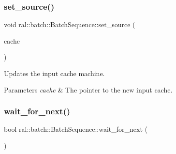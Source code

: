\subsubsection{\texorpdfstring{set\+\_\+source()}{set\_source()}}
{\footnotesize\ttfamily void ral\+::batch\+::\+Batch\+Sequence\+::set\+\_\+source (\begin{DoxyParamCaption}\item[{std\+::shared\+\_\+ptr$<$ \hyperlink{classral_1_1cache_1_1CacheMachine}{ral\+::cache\+::\+Cache\+Machine} $>$}]{cache }\end{DoxyParamCaption})}

Updates the input cache machine. 
\begin{DoxyParams}{Parameters}
{\em cache} & The pointer to the new input cache. \\
\hline
\end{DoxyParams}
\mbox{\label{classral_1_1batch_1_1BatchSequence_af62f1f620ac02a018737af8a89eb4881}} 
\subsubsection{\texorpdfstring{wait\+\_\+for\+\_\+next()}{wait\_for\_next()}}
{\footnotesize\ttfamily bool ral\+::batch\+::\+Batch\+Sequence\+::wait\+\_\+for\+\_\+next (\begin{DoxyParamCaption}{ }\end{DoxyParamCaption})}

